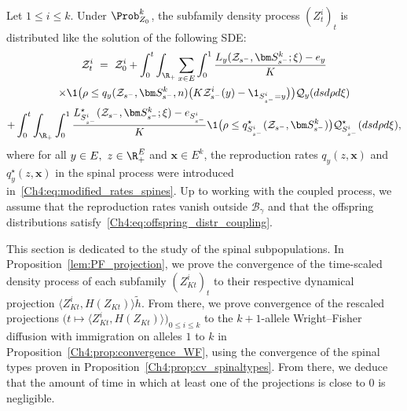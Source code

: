 \begin{refsegment}
 Let $1\leq i \leq k$. Under $\Prob^k_{Z_0}$, the subfamily density process $(Z^i_t)_t$ is distributed like the solution of the following SDE:
\begin{multline}\label{Ch4:eq:SDE_subfam_Pk}
\mathcal Z^i_t\ =\ \mathcal Z^i_0  + 
\int_0^t \int_{\R_+}\sum_{x\in E}\int_{0}^1 \frac{L_y(\mathcal{Z}_{s^-},\bm S^k_{s^-}; \xi) -e_y}{K}\\
\times \1\big(\rho\leq  q_{y}(\mathcal Z_{s^-}, \bm S^k_{s^-}, n)\big(K\mathcal Z^i_{s^-}(y)-\1_{S^{i}_{s^-}=y}\big)\big)\mathcal{Q}_{y}(dsd\rho d\xi)\\
+ \int_0^t \int_{\R_+} \int_0^1 \frac{L^\star_{S^{i}_{s^-}}(\mathcal{Z}_{s^-},\bm S^k_{s^-}; \xi) -e_{S^{i}_{s^-}}}{K}\1\big(\rho\leq q^{\star }_{S^{i}_{s^-}}(\mathcal Z_{s^-}, \bm S^k_{s^-})\big)\mathcal{Q}^{\star}_{S^{i}_{s^-}}(dsd\rho d\xi),
\end{multline}
where for all $y\in E,\ z\in \R_+^E$ and $\bm x\in E^k$, the reproduction rates $q_y(z,\bm x)$ and $q^{\star }_y(z,\bm x)$ in the spinal process were introduced in~\eqref{Ch4:eq:modified_rates_spines}.
Up to working with the coupled process, we assume that the reproduction rates vanish outside $\mathscr{B}_{\gamma}$ and that the offspring distributions satisfy~\eqref{Ch4:eq:offspring_distr_coupling}.


This section is dedicated to the study of the spinal subpopulations. In Proposition~\ref{lem:PF_projection}, we prove the convergence of the time-scaled density process of each subfamily $(Z^i_{Kt})_t$ to their respective dynamical projection $\langle Z^i_{Kt}, H(Z_{Kt})\rangle \tilde h$.
From there, we prove convergence of the rescaled projections $\big(t\mapsto \langle Z^i_{Kt}, H(Z_{Kt})\rangle\big)_{0\leq i\leq k}$ to the $k+1$-allele Wright--Fisher diffusion with immigration on alleles $1$ to $k$ in Proposition~\ref{Ch4:prop:convergence_WF}, using the convergence of the spinal types proven in Proposition~\ref{Ch4:prop:cv_spinaltypes}. From there, we deduce that the amount of time in which at least one of the projections is close to $0$ is negligible.



\end{refsegment}
